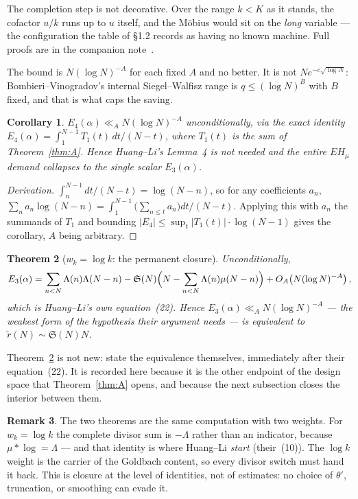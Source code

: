 \documentclass[11pt,a4paper]{article}
\theoremstyle{plain}
\newtheorem{theorem}{Theorem}
\newtheorem{corollary}[theorem]{Corollary}
\theoremstyle{definition}
\newtheorem{remark}[theorem]{Remark}
\renewcommand{\SS}{\mathfrak{S}}
\begin{document}
The completion step is not decorative. Over the range $k<K$ as it
stands, the cofactor $u/k$ runs up to $u$ itself, and the M\"obius
would sit on the \emph{long} variable --- the configuration the table
of \S1.2 records as having no known machine. Full proofs are in the
companion note~\cite{ThmA}.

The bound is $N(\log N)^{-A}$ for each fixed $A$ and no better. It is
not $Ne^{-c\sqrt{\log N}}$: Bombieri--Vinogradov's internal
Siegel--Walfisz range is $q\le(\log N)^B$ with $B$ fixed, and that is
what caps the saving.

\begin{corollary}\label{cor:B}
$E_4(\alpha) \ll_A N(\log N)^{-A}$ unconditionally, via the exact
identity $E_4(\alpha) = \int_1^{N-1} T_1(t)\,dt/(N-t)$, where
$T_1(t)$ is the sum of Theorem~\ref{thm:A}. Hence Huang--Li's Lemma~4
is not needed and the entire $EH_\mu$ demand collapses to the single
scalar $E_3(\alpha)$.
\end{corollary}

\begin{proof}[Derivation]
$\int_n^{N-1}dt/(N-t) = \log(N-n)$, so for any coefficients $a_n$,
$\sum_n a_n\log(N-n) = \int_1^{N-1}\bigl(\sum_{n\le t}a_n\bigr)
dt/(N-t)$. Applying this with $a_n$ the summands of $T_1$ and bounding
$|E_4|\le \sup_t|T_1(t)|\cdot\log(N-1)$ gives the corollary, $A$ being
arbitrary.
\end{proof}

\begin{theorem}[$w_k = \log k$: the permanent closure]\label{thm:C}
Unconditionally,
\[
  E_3(\alpha) = \sum_{n<N}\Lambda(n)\Lambda(N-n)
   - \SS(N)\Bigl(N - \sum_{n<N}\Lambda(n)\mu(N-n)\Bigr)
   + O_A\!\left(N(\log N)^{-A}\right),
\]
which is Huang--Li's own equation~(22). Hence
$E_3(\alpha)\ll_A N(\log N)^{-A}$ --- the weakest form of the
hypothesis their argument needs --- is \emph{equivalent} to
$\tilde r(N)\sim\SS(N)N$.
\end{theorem}

Theorem~\ref{thm:C} is not new: \cite{HL} state the equivalence
themselves, immediately after their equation~(22). It is recorded here
because it is the other endpoint of the design space that
Theorem~\ref{thm:A} opens, and because the next subsection closes the
interior between them.

\begin{remark}
The two theorems are the same computation with two weights. For
$w_k = \log k$ the complete divisor sum is $-\Lambda$ rather than an
indicator, because $\mu * \log = \Lambda$ --- and that identity is
where Huang--Li \emph{start} (their~(10)). The $\log k$ weight is the
carrier of the Goldbach content, so every divisor switch must hand it
back. This is closure at the level of identities, not of estimates: no
choice of $\theta'$, truncation, or smoothing can evade it.
\end{remark}
\end{document}
